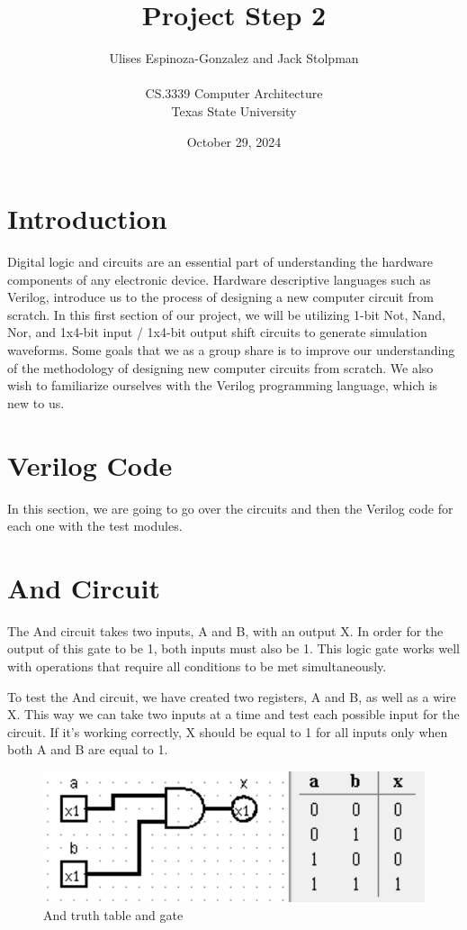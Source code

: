 \documentclass[12pt]{article}
\title{Project Step 2}
\author{Ulises Espinoza-Gonzalez and Jack Stolpman\\
\AND\\
\AND
\AND
\AND
\AND
	CS.3339 Computer Architecture\\
\AND
	Texas State University\\
}
\date{October 29, 2024}
\begin{document}
\maketitle

\newpage
\thispagestyle{empty}


\newpage
\setcounter{page}{1}
\section{Introduction}
Digital logic and circuits are an essential part of understanding the hardware components of any electronic device. Hardware descriptive languages such as Verilog, introduce us to the process of designing a new computer circuit from scratch. In this first section of our project, we will be utilizing 1-bit Not, Nand, Nor, and 1x4-bit input / 1x4-bit output shift circuits to generate simulation waveforms. Some goals that we as a group share is to improve our understanding of the methodology of designing new computer circuits from scratch. We also wish to familiarize ourselves with the Verilog programming language, which is new to us. 

\section{Verilog Code}
\label{sec:headings}

In this section, we are going to go over the circuits and then the Verilog code for each one with the test modules.





\section{And Circuit}
The And circuit takes two inputs, A and B, with an output X. In order for the output of this gate to be 1, both inputs must also be 1. This logic gate works well with operations that require all conditions to be met simultaneously.


To test the And circuit, we have created two registers, A and B, as well as a wire X. This way we can take two inputs at a time and test each possible input for the circuit. If it's working correctly, X should be equal to 1 for all inputs only when both A and B are equal to 1.


\begin{figure}[h]
    \centering
    \includegraphics[width = 1.0\textwidth]{figs/andGate.png}
    \caption{And truth table and gate}
    \label{fig:enter-label}
\end{figure}
\end{document}
